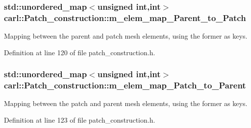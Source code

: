 \subsubsection[{m\+\_\+elem\+\_\+map\+\_\+\+Parent\+\_\+to\+\_\+\+Patch}]{\setlength{\rightskip}{0pt plus 5cm}std\+::unordered\+\_\+map$<$unsigned int,int$>$ carl\+::\+Patch\+\_\+construction\+::m\+\_\+elem\+\_\+map\+\_\+\+Parent\+\_\+to\+\_\+\+Patch\hspace{0.3cm}{\ttfamily [protected]}}\label{classcarl_1_1_patch__construction_a2552a3745b426adbd06864ade93b9973}


Mapping between the parent and patch mesh elements, using the former as keys. 



Definition at line 120 of file patch\+\_\+construction.\+h.

\hypertarget{classcarl_1_1_patch__construction_a801e75fa9573645a57d24b996611fe4d}{}
\subsubsection[{m\+\_\+elem\+\_\+map\+\_\+\+Patch\+\_\+to\+\_\+\+Parent}]{\setlength{\rightskip}{0pt plus 5cm}std\+::unordered\+\_\+map$<$unsigned int,int$>$ carl\+::\+Patch\+\_\+construction\+::m\+\_\+elem\+\_\+map\+\_\+\+Patch\+\_\+to\+\_\+\+Parent\hspace{0.3cm}{\ttfamily [protected]}}\label{classcarl_1_1_patch__construction_a801e75fa9573645a57d24b996611fe4d}


Mapping between the patch and parent mesh elements, using the former as keys. 



Definition at line 123 of file patch\+\_\+construction.\+h.

\hypertarget{classcarl_1_1_patch__construction_a11aed0d9b1e61d152d02cf56e1690c53}{}
